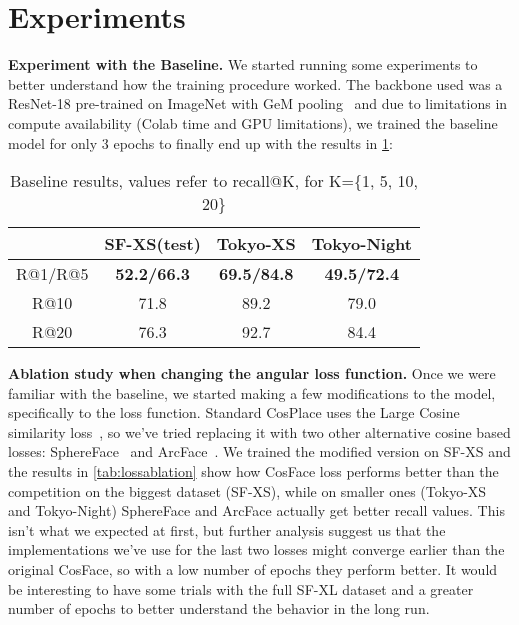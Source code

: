 \documentclass[10pt,twocolumn,letterpaper]{article}
\begin{document}
\section{Experiments}
\textbf{Experiment with the Baseline.}
We started running some experiments to better understand how the training procedure worked. The backbone used was a ResNet-18 pre-trained on ImageNet with GeM pooling~\cite{finetuning} and due to limitations in compute availability (\eg Colab time and GPU limitations), we trained the baseline model for only 3 epochs to finally end up with the results in \cref{tab:baseline}:


\begin{table}[htp]
  \centering
  \begin{tabular}{@{}cccc@{}}
    \toprule
    & SF-XS(test) & Tokyo-XS & Tokyo-Night\\
    \midrule
    R@1/R@5 & \textbf{52.2/66.3} & \textbf{69.5/84.8} & \textbf{49.5/72.4} \\
    R@10 & 71.8 & 89.2 & 79.0\\
    R@20 & 76.3 & 92.7 & 84.4\\
    \bottomrule
  \end{tabular}
  \caption{Baseline results, values refer to recall@K, for K=\{1, 5, 10, 20\}}
  \label{tab:baseline}
\end{table}


\textbf{Ablation study when changing the angular loss function.}
Once we were familiar with the baseline, we started making a few modifications to the model, specifically to the loss function. Standard CosPlace uses the Large Cosine similarity loss~\cite{cosface}, so we've tried replacing it with two other alternative cosine based losses: SphereFace~\cite{sphereface} and ArcFace~\cite{arcface}.
We trained the modified version on SF-XS and the results in \cref{tab:lossablation} show how CosFace loss performs better than the competition on the biggest dataset (SF-XS), while on smaller ones (Tokyo-XS and Tokyo-Night) SphereFace and ArcFace actually get better recall values. This isn't what we expected at first, but further analysis suggest us that the implementations we've use for the last two losses might converge earlier than the original CosFace, so with a low number of epochs they perform better.
It would be interesting to have some trials with the full SF-XL dataset and a greater number of epochs to better understand the behavior in the long run.
\end{document}
